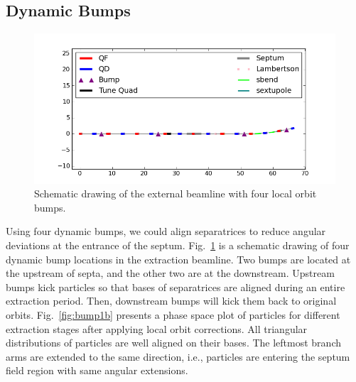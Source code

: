 \documentclass[aps,prstab,onecolumn,preprint]{revtex4-1}
\begin{document}
\subsection{\label{sec:bump1}Dynamic Bumps}

\begin{figure}[!tbp]
  \includegraphics[width=.45\textwidth]{img/fig_bump2}
  \caption{\label{fig:bump2}Schematic drawing of the external beamline with four local orbit bumps.}
\end{figure}

Using four dynamic bumps, we could align separatrices to reduce angular deviations at the entrance of the septum. Fig.~\ref{fig:bump2} is a schematic drawing of four dynamic bump locations in the extraction beamline. Two bumps are located at the upstream of septa, and the other two are at the downstream. Upstream bumps kick particles so that bases of separatrices are aligned during an entire extraction period. Then, downstream bumps will kick them back to original orbits. Fig.~\ref{fig:bump1b} presents a phase space plot of particles for different extraction stages after applying local orbit corrections. All triangular distributions of particles are well aligned on their bases. The leftmost branch arms are extended to the same direction, i.e., particles are entering the septum field region with same angular extensions.
\end{document}
